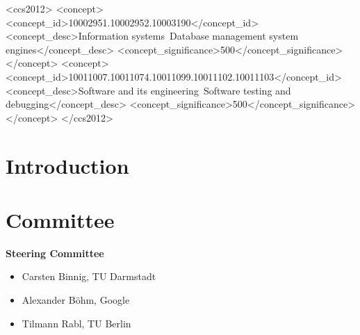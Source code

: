 \documentclass[sigconf]{acmart}
\begin{document}
\begin{CCSXML}
<ccs2012>
   <concept>
       <concept_id>10002951.10002952.10003190</concept_id>
       <concept_desc>Information systems~Database management system engines</concept_desc>
       <concept_significance>500</concept_significance>
       </concept>
   <concept>
       <concept_id>10011007.10011074.10011099.10011102.10011103</concept_id>
       <concept_desc>Software and its engineering~Software testing and debugging</concept_desc>
       <concept_significance>500</concept_significance>
       </concept>
 </ccs2012>
\end{CCSXML}



\maketitle

\section{Introduction}

\section{Committee}

\textbf{Steering Committee}
\begin{itemize}
	\item Carsten Binnig, TU Darmstadt
	\item Alexander Böhm, Google
	\item Tilmann Rabl, TU Berlin
\end{itemize}
\end{document}
